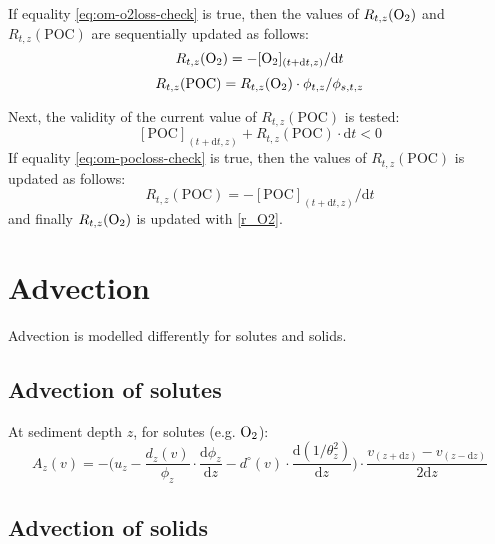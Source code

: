 \documentclass[a4paper]{article}
\newcommand{\D}[1]{\mathrm{d}#1}
\newcommand{\dydx}[2]{\frac{\D{#1}}{\D{#2}}}
\begin{document}
If equality \eqref{eq:om-o2loss-check} is true, then the values of $R_{t,z}(\ce{O2})$ and $R_{t,z}(\mathrm{POC})$ are sequentially updated as follows:
\begin{equation}
R_{t,z}(\ce{O2}) = -[\ce{O2}]_{(t+\D{t}, z)} / \D{t}
\end{equation}
\begin{equation}
R_{t,z}(\mathrm{POC}) = R_{t,z}(\ce{O2}) \cdot \phi_{t,z} / \phi_{s,t,z}
\end{equation}

Next, the validity of the current value of $R_{t,z}(\mathrm{POC})$ is tested:
\begin{equation}\label{eq:om-pocloss-check}
[\mathrm{POC}]_{(t+\D{t}, z)} + R_{t,z}(\mathrm{POC}) \cdot \D{t} < 0
\end{equation}
If equality \eqref{eq:om-pocloss-check} is true, then the values of $R_{t,z}(\mathrm{POC})$ is updated as follows:
\begin{equation}
R_{t,z}(\mathrm{POC}) = -[\mathrm{POC}]_{(t+\D{t}, z)} / \D{t}
\end{equation}
and finally $R_{t,z}(\ce{O2})$ is updated with \eqref{r_O2}.


\section{Advection}\label{sx:advection}

Advection is modelled differently for solutes and solids.


\subsection{Advection of solutes}

At sediment depth $z$, for solutes (e.g. $\ce{O2}$):
\begin{equation}
A_z(v) = -\Bigg( u_z - \frac{d_z(v)}{\phi_z} \cdot \dydx{\phi_z}{z} - d^\circ(v) \cdot \dydx{(1/\theta_z^2)}{z} \Bigg) \cdot \frac{v_{(z+\D{z})} - v_{(z-\D{z})}}{2\D{z}}
\end{equation}


\subsection{Advection of solids}
\end{document}
